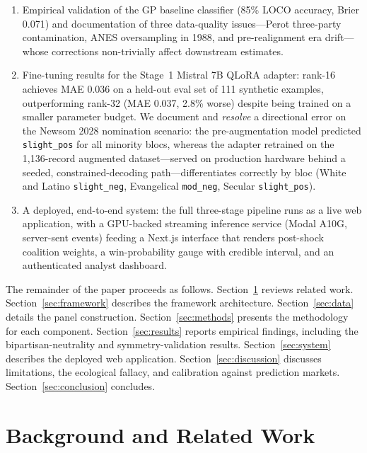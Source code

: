 \documentclass[12pt, letterpaper]{article}
\theoremstyle{definition}
\begin{document}
\begin{enumerate}
  \item Empirical validation of the GP baseline classifier (85\% LOCO accuracy,
        Brier 0.071) and documentation of three data-quality issues---Perot
        three-party contamination, ANES oversampling in 1988, and pre-realignment
        era drift---whose corrections non-trivially affect downstream estimates.

  \item Fine-tuning results for the Stage~1 Mistral 7B QLoRA adapter: rank-16
        achieves MAE 0.036 on a held-out eval set of 111 synthetic examples,
        outperforming rank-32 (MAE 0.037, 2.8\% worse) despite being trained on
        a smaller parameter budget. We document and \emph{resolve} a directional
        error on the Newsom 2028 nomination scenario: the pre-augmentation model
        predicted \texttt{slight\_pos} for all minority blocs, whereas the adapter
        retrained on the 1,136-record augmented dataset---served on production
        hardware behind a seeded, constrained-decoding path---differentiates
        correctly by bloc (White and Latino \texttt{slight\_neg}, Evangelical
        \texttt{mod\_neg}, Secular \texttt{slight\_pos}).

  \item A deployed, end-to-end system: the full three-stage pipeline runs as a
        live web application, with a GPU-backed streaming inference service
        (Modal A10G, server-sent events) feeding a Next.js interface that renders
        post-shock coalition weights, a win-probability gauge with credible
        interval, and an authenticated analyst dashboard.
\end{enumerate}

The remainder of the paper proceeds as follows. Section~\ref{sec:background}
reviews related work. Section~\ref{sec:framework} describes the framework
architecture. Section~\ref{sec:data} details the panel construction. Section~\ref{sec:methods}
presents the methodology for each component. Section~\ref{sec:results} reports
empirical findings, including the bipartisan-neutrality and symmetry-validation
results. Section~\ref{sec:system} describes the deployed web application.
Section~\ref{sec:discussion} discusses limitations, the ecological fallacy, and
calibration against prediction markets. Section~\ref{sec:conclusion} concludes.

\section{Background and Related Work}
\label{sec:background}
\end{document}
